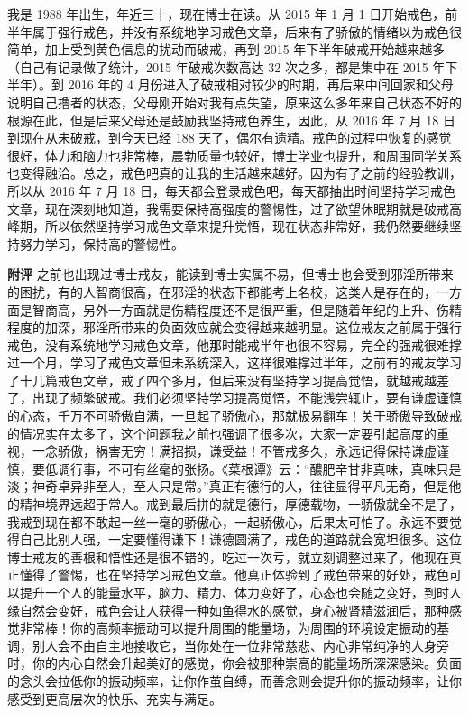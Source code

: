 \begin{case}
    我是 1988 年出生，年近三十，现在博士在读。从 2015 年 1 月 1 日开始戒色，前半年属于强行戒色，并没有系统地学习戒色文章，后来有了骄傲的情绪以为戒色很简单，加上受到黄色信息的扰动而破戒，再到 2015 年下半年破戒开始越来越多（自己有记录做了统计，2015 年破戒次数高达 32 次之多，都是集中在 2015 年下半年）。到 2016 年的 4 月份进入了破戒相对较少的时期，再后来中间回家和父母说明自己撸者的状态，父母刚开始对我有点失望，原来这么多年来自己状态不好的根源在此，但是后来父母还是鼓励我坚持戒色养生，因此，从 2016 年 7 月 18 日到现在从未破戒，到今天已经 188 天了，偶尔有遗精。戒色的过程中恢复的感觉很好，体力和脑力也非常棒，晨勃质量也较好，博士学业也提升，和周围同学关系也变得融洽。总之，戒色吧真的让我的生活越来越好。因为有了之前的经验教训，所以从 2016 年 7 月 18 日，每天都会登录戒色吧，每天都抽出时间坚持学习戒色文章，现在深刻地知道，我需要保持高强度的警惕性，过了欲望休眠期就是破戒高峰期，所以依然坚持学习戒色文章来提升觉悟，现在状态非常好，我仍然要继续坚持努力学习，保持高的警惕性。

    \textbf{附评} 之前也出现过博士戒友，能读到博士实属不易，但博士也会受到邪淫所带来的困扰，有的人智商很高，在邪淫的状态下都能考上名校，这类人是存在的，一方面是智商高，另外一方面就是伤精程度还不是很严重，但是随着年纪的上升、伤精程度的加深，邪淫所带来的负面效应就会变得越来越明显。这位戒友之前属于强行戒色，没有系统地学习戒色文章，他那时能戒半年也很不容易，完全的强戒很难撑过一个月，学习了戒色文章但未系统深入，这样很难撑过半年，之前有的戒友学习了十几篇戒色文章，戒了四个多月，但后来没有坚持学习提高觉悟，就越戒越差了，出现了频繁破戒。我们必须坚持学习提高觉悟，不能浅尝辄止，要有谦虚谨慎的心态，千万不可骄傲自满，一旦起了骄傲心，那就极易翻车！关于骄傲导致破戒的情况实在太多了，这个问题我之前也强调了很多次，大家一定要引起高度的重视，一念骄傲，祸害无穷！满招损，谦受益！不管戒多久，永远记得保持谦虚谨慎，要低调行事，不可有丝毫的张扬。《菜根谭》云：“醲肥辛甘非真味，真味只是淡；神奇卓异非至人，至人只是常。”真正有德行的人，往往显得平凡无奇，但是他的精神境界远超于常人。戒到最后拼的就是德行，厚德载物，一骄傲就全不是了，我戒到现在都不敢起一丝一毫的骄傲心，一起骄傲心，后果太可怕了。永远不要觉得自己比别人强，一定要懂得谦下！谦德圆满了，戒色的道路就会宽坦很多。这位博士戒友的善根和悟性还是很不错的，吃过一次亏，就立刻调整过来了，他现在真正懂得了警惕，也在坚持学习戒色文章。他真正体验到了戒色带来的好处，戒色可以提升一个人的能量水平，脑力、精力、体力变好了，心态也会随之变好，到时人缘自然会变好，戒色会让人获得一种如鱼得水的感觉，身心被肾精滋润后，那种感觉非常棒！你的高频率振动可以提升周围的能量场，为周围的环境设定振动的基调，别人会不由自主地接收它，当你处在一位非常慈悲、内心非常纯净的人身旁时，你的内心自然会升起美好的感觉，你会被那种崇高的能量场所深深感染。负面的念头会拉低你的振动频率，让你作茧自缚，而善念则会提升你的振动频率，让你感受到更高层次的快乐、充实与满足。
\end{case}

